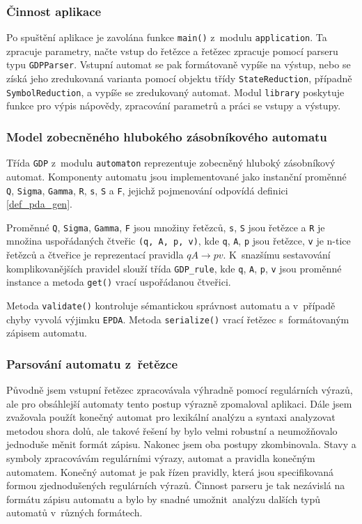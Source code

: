 \subsubsection{Činnost aplikace}

Po spuštění aplikace je zavolána funkce \texttt{main()} z~modulu \texttt{application}. Ta zpracuje parametry, načte vstup do řetězce a řetězec zpracuje pomocí parseru typu \texttt{GDPParser}. Vstupní automat se pak formátovaně vypíše na výstup, nebo se získá jeho zredukovaná varianta pomocí objektu třídy \texttt{StateReduction}, případně \texttt{SymbolReduction}, a vypíše se zredukovaný automat. Modul \texttt{library} poskytuje funkce pro výpis nápovědy, zpracování parametrů a práci se vstupy a výstupy.


\subsubsection{Model zobecněného hlubokého zásobníkového automatu}

Třída \texttt{GDP} z~modulu \texttt{automaton} reprezentuje zobecněný hluboký zásobníkový automat. Komponenty automatu jsou implementované jako instanční proměnné \texttt{Q}, \texttt{Sigma}, \texttt{Gamma}, \texttt{R}, \texttt{s}, \texttt{S} a \texttt{F}, jejichž pojmenování odpovídá definici \ref{def_pda_gen}. 

Proměnné \texttt{Q}, \texttt{Sigma}, \texttt{Gamma}, \texttt{F} jsou množiny řetězců, \texttt{s}, \texttt{S} jsou řetězce a \texttt{R} je množina uspořádaných čtveřic \texttt{(q, A, p, v)}, kde \texttt{q}, \texttt{A}, \texttt{p} jsou řetězce, \texttt{v} je n-tice řetězců a čtveřice je reprezentací pravidla $qA \rightarrow pv$. 
K~snazšímu sestavování komplikovanějších pravidel slouží třída \texttt{GDP\_rule}, kde \texttt{q}, \texttt{A}, \texttt{p}, \texttt{v} jsou proměnné instance a metoda \texttt{get()} vrací uspořádanou čtveřici.

Metoda \texttt{validate()} kontroluje sémantickou správnost automatu a v~případě chyby vyvolá výjimku \texttt{EPDA}. Metoda \texttt{serialize()} vrací řetězec s~formátovaným zápisem automatu.

\subsubsection{Parsování automatu z~řetězce}

Původně jsem vstupní řetězec zpracovávala výhradně pomocí regulárních výrazů, ale pro obsáhlejší automaty tento postup výrazně zpomaloval aplikaci. Dále jsem zvažovala použít konečný automat pro lexikální analýzu a syntaxi analyzovat metodou shora dolů, ale takové řešení by bylo velmi robustní a neumožňovalo jednoduše měnit formát zápisu. Nakonec jsem oba postupy zkombinovala. Stavy a symboly zpracovávám regulárními výrazy, automat a pravidla konečným automatem. Konečný automat je pak řízen pravidly, která jsou specifikovaná formou zjednodušených regulárních výrazů. Činnost parseru je tak nezávislá na formátu zápisu automatu a bylo by snadné umožnit~analýzu dalších typů automatů v~různých formátech.

